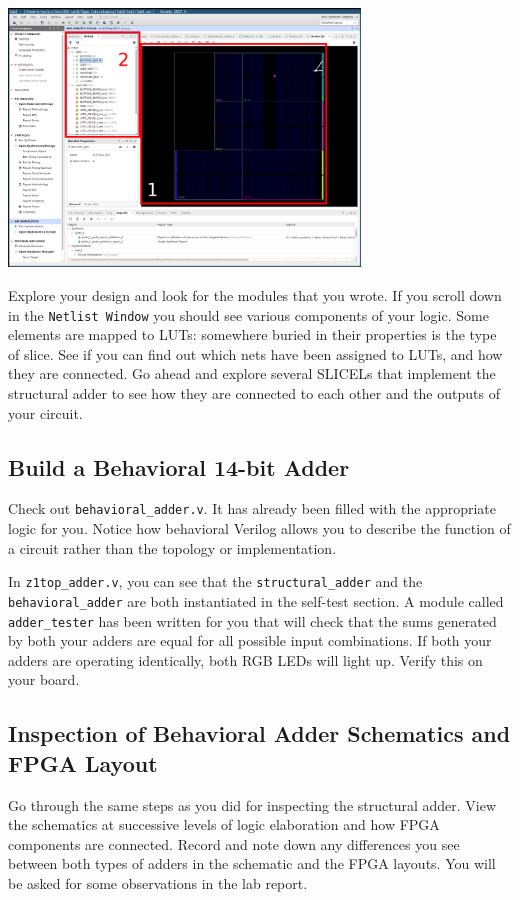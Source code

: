 \documentclass[11pt]{article}
\begin{document}
\begin{center}
  \includegraphics[width=0.7\textwidth]{figs/fpga_layout.png}
\end{center}

Explore your design and look for the modules that you wrote. If you scroll down in the \verb|Netlist Window| you should see various components of your logic. Some elements are mapped to LUTs: somewhere buried in their properties is the type of slice. See if you can find out which nets have been assigned to LUTs, and how they are connected. Go ahead and explore several SLICELs that implement the structural adder to see how they are connected to each other and the outputs of your circuit.

\subsection{Build a Behavioral 14-bit Adder}
Check out \verb|behavioral_adder.v|. It has already been filled with the appropriate logic for you. Notice how behavioral Verilog allows you to describe the function of a circuit rather than the topology or implementation.

In \verb|z1top_adder.v|, you can see that the \verb|structural_adder| and the \verb|behavioral_adder| are both instantiated in the self-test section. A module called \verb|adder_tester| has been written for you that will check that the sums generated by both your adders are equal for all possible input combinations. If both your adders are operating identically, both RGB LEDs will light up. Verify this on your board.

\subsection{Inspection of Behavioral Adder Schematics and FPGA Layout}
Go through the same steps as you did for inspecting the structural adder. View the schematics at successive levels of logic elaboration and how FPGA components are connected. Record and note down any differences you see between both types of adders in the schematic and the FPGA layouts. You will be asked for some observations in the lab report.
\end{document}
